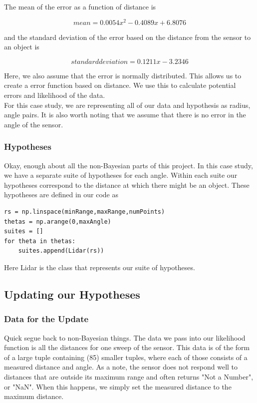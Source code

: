 \documentclass{article}
\begin{document}
The mean of the error as a function of distance is 

\begin{equation}
mean = 0.0054x^2 - 0.4089x + 6.8076
\end{equation}

and the standard deviation of the error based on the distance from the sensor to an object is 

\begin{equation}
standard deviation  = 0.1211x - 3.2346
\end{equation}

Here, we also assume that the error is normally distributed. This allows us to create a error function based on distance. We use this to calculate potential errors and likelihood of the data.\\
For this case study, we are representing all of our data and hypothesis as radius, angle pairs. It is also worth noting that we assume that there is no error in the angle of the sensor.\\

\subsubsection{Hypotheses}
Okay, enough about all the non-Bayesian parts of this project. In this case study, we have a separate suite of hypotheses for each angle. Within each suite our hypotheses correspond to the distance at which there might be an object. These hypotheses are defined in our code as  
\begin{lstlisting}
rs = np.linspace(minRange,maxRange,numPoints)
thetas = np.arange(0,maxAngle)
suites = []
for theta in thetas:
    suites.append(Lidar(rs))
\end{lstlisting}

Here Lidar is the class that represents our suite of hypotheses.

\subsection{Updating our Hypotheses}
\subsubsection{Data for the Update}
Quick segue back to non-Bayesian things. The data we pass into our likelihood function is all the distances for one sweep of the sensor. This data is of the form of a large tuple containing (85) smaller tuples, where each of those consists of a measured distance and angle. As a note, the sensor does not respond well to distances that are outside its maximum range and often returns "Not a Number", or "NaN". When this happens, we simply set the measured distance to the maximum distance.
\end{document}

